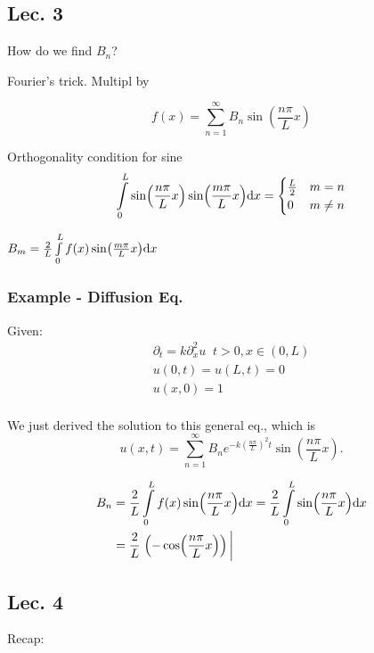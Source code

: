 \begin{quest}
	\item 
\end{quest}




\subsection*{Lec. 3}

How do we find $B_n$?

Fourier's trick.
Multipl by

\[ f(x) = \sum\limits_{n=1}^\infty B_n \sin (\frac{n\pi}{L} x) \]

Orthogonality condition for sine 
\[ 
	\int\limits_0^L \sin(\frac{n\pi}{L} x) \sin(\frac{m\pi}{L} x) \text{d} x 
	= \begin{cases}
		\frac{L}{2} & m=n \\
		0 & m\neq n
	\end{cases}
\]

$ B_m  = \frac{2}{L} \int\limits_0^L f(x) \sin(\frac{m\pi}{L} x) \text{d} x  $

\subsubsection*{Example - Diffusion Eq.}
Given: 
\begin{gather*}
	\partial_t  = k\partial_x^2 u \;\; t>0, x\in (0, L) \\
	u(0, t) = u(L, t) = 0 \\
	u(x, 0) = 1 \\
\end{gather*}

We just derived the solution to this general eq., which is 
\[ u(x, t) = \sum\limits_{n=1}^\infty B_n  e^{-k(\frac{n\pi}{L})^2  t} \sin (\frac{n\pi}{L}x) .\]

\[\begin{aligned}
	B_n &= \frac{2}{L} \int\limits_0^L f(x) \sin(\frac{n\pi}{L} x) \d x 
		= \frac{2}{L} \int\limits_0^L \sin(\frac{n\pi}{L} x) \d x  \\
		&= \frac{2}{L} \eval{
			\left( -\cos (\frac{n\pi}{L} x) \right)
		}
\end{aligned}
	\]


\subsection*{Lec. 4}

Recap:

